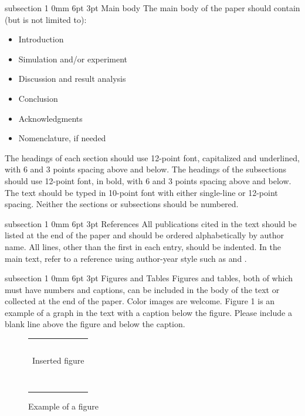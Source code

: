 \documentclass[twocolumn, 10pt, times, letterpaper]{article}
\makeatletter
\renewcommand{\subsection}{\@startsection
   {subsection}%
   {1}%
   {0mm}%
   {6pt}%
   {3pt}%
  {\noindent \fontsize{10}{12}\selectfont \bf}}  %
\makeatother
\begin{document}
\subsection{Main body}
The main body of the paper should contain (but is not limited to):
\begin{itemize}
\item
Introduction
\item
Simulation and/or experiment
\item
Discussion and result analysis
\item
Conclusion
\item
Acknowledgments
\item
Nomenclature, if needed
\end{itemize}
The headings of each section should use 12-point font, capitalized and underlined, with 6 and 3 points spacing above and below. The headings of the subsections should use 12-point font, in bold, with 6 and 3 points spacing above and below. The text should be typed in 10-point font with either single-line or 12-point spacing. Neither the sections or subsections should be numbered.


\subsection{References}
All publications cited in the text should be listed at the end of the paper and should be ordered alphabetically by author name.  All lines, other than the first in each entry, should be indented. In the main text, refer to a reference using author-year style
such as \cite{InePerSea1987} and \cite{Modest1993}.

\subsection{Figures and Tables}
Figures and tables, both of which must have numbers and captions, can be included in the body of the text or collected at the end of the paper. Color images are welcome.  Figure 1 is an example of a graph in the text with a caption below the figure. Please include a blank line above the figure and below the caption.

\begin{figure}[h!]
\centering
\begin{tabular}{|c|}
\hline ~\\
\Large{Inserted figure} \\ ~\\
 \\
 \\
 \\ \hline
\end{tabular}
\caption{Example of a figure}
\end{figure}
\end{document}
